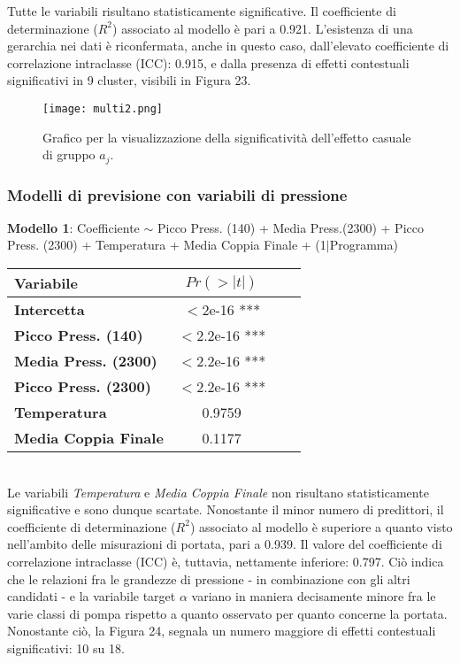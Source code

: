 \documentclass[fleqn,10pt]{SelfArx} %
\begin{document}
Tutte le variabili risultano statisticamente significative. Il coefficiente di determinazione ($R^2$) associato al modello è pari a 0.921. L'esistenza di una gerarchia nei dati è riconfermata, anche in questo caso, dall'elevato coefficiente di correlazione intraclasse (ICC): 0.915, e dalla presenza di effetti contestuali significativi in 9 cluster, visibili in Figura 23.
\begin{figure}[H]
    \centering
    \texttt{[image: multi2.png]}
    \label{fig:em}
    \caption{Grafico per la visualizzazione della significatività dell'effetto casuale di gruppo $a_j$.}
\end{figure}
\subsubsection{Modelli di previsione con variabili di pressione}
\textbf{Modello 1}: Coefficiente $\sim$  Picco Press. (140) + Media Press.(2300) + Picco Press. (2300) + Temperatura + Media Coppia Finale + (1$\mid$Programma)
{\begin{table}[h] 
\centering
\begin{tabular}[t]{lccc}
\toprule 
Variabile&$Pr(> |t|)$\\
\midrule 
\textbf{Intercetta}&$<$2e-16 ***&\\
\textbf{Picco Press. (140)}&$<$2.2e-16 ***\\ 
\textbf{Media Press. (2300)}&$<$2.2e-16 ***\\ 
\textbf{Picco Press. (2300)}&$<$2.2e-16 ***\\ 
\textbf{Temperatura}&0.9759\\
\textbf{Media Coppia Finale}&0.1177\\
\bottomrule 
\end{tabular}
\end{table}}\\
Le variabili \textit{Temperatura} e \textit{Media Coppia Finale} non risultano statisticamente significative e sono dunque scartate. Nonostante il minor numero di predittori, il coefficiente di determinazione ($R^2$) associato al modello è superiore a quanto visto nell'ambito delle misurazioni di portata, pari a 0.939. Il valore del coefficiente di correlazione intraclasse (ICC) è, tuttavia, nettamente inferiore: 0.797. Ciò indica che le relazioni fra le grandezze di pressione - in combinazione con gli altri candidati - e la variabile target $\alpha$ variano in maniera decisamente minore fra le varie classi di pompa rispetto a quanto osservato per quanto concerne la portata. Nonostante ciò, la Figura 24, segnala un numero maggiore di effetti contestuali significativi: 10 su 18.
\end{document}
